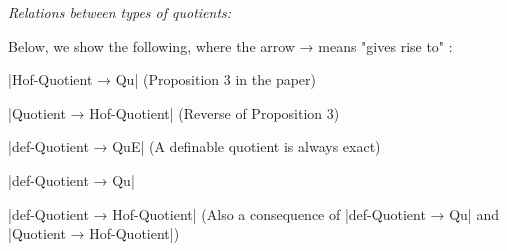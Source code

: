 \emph{Relations between types of quotients:}

Below, we show the following, where the arrow → means "gives rise to" :

|Hof-Quotient → Qu| (Proposition 3 in the paper)

|Quotient → Hof-Quotient| (Reverse of Proposition 3)

|def-Quotient → QuE| (A definable quotient is always exact)

|def-Quotient → Qu|

|def-Quotient → Hof-Quotient| (Also a consequence of |def-Quotient → Qu| and |Quotient → Hof-Quotient|)

\begin{code}\>\<%
\\
%
\\
\> \AgdaSymbol{:} \AgdaSymbol{\{} \AgdaSymbol{:} \AgdaSymbol{\}\{} \AgdaSymbol{:}   \AgdaSymbol{\}\{}  \AgdaSymbol{:} \AgdaSymbol{\}\{} \AgdaSymbol{:}  \AgdaSymbol{\}\{} \AgdaSymbol{:}  \AgdaSymbol{\}(} \AgdaSymbol{:}   \AgdaSymbol{)}         \AgdaSymbol{(} \AgdaInductiveConstructor{,} \AgdaSymbol{)}  \AgdaSymbol{(} \AgdaInductiveConstructor{,} \AgdaSymbol{)}\<%
\\
\>   \AgdaSymbol{=} \<%
\\
%
\\
%
\\
\> \AgdaSymbol{:}  \AgdaSymbol{\{} \AgdaSymbol{:} \AgdaSymbol{\}\{} \AgdaSymbol{:}   \AgdaSymbol{\}}\<%
\\
\>[2]\<[8]%
\>[8] \AgdaSymbol{(} \AgdaSymbol{:}     \AgdaSymbol{)}\<%
\\
\>[2]\<[8]%
\>[8]     \AgdaSymbol{(} \AgdaSymbol{)}  \AgdaSymbol{)}\<%

\end{code}

